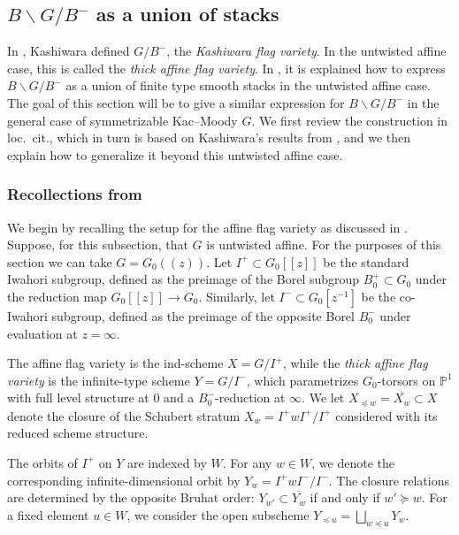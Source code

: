 \documentclass{amsart}
\theoremstyle{definition}
\numberwithin{equation}{section}
\begin{document}
\subsection{$B\backslash G / B^-$ as a union of stacks}\label{sec:unionofstacks}
In \cite{K}, Kashiwara defined $G/B^-$, the \emph{Kashiwara flag variety}. In the untwisted affine case, this is called the \emph{thick affine flag variety}. In \cite[\S 5.2]{Yun}, it is explained how to express $B\backslash G/B^-$ as a union of finite type smooth stacks in the untwisted affine case. The goal of this section will be to give a similar expression for $B\backslash G/B^-$ in the general case of symmetrizable Kac--Moody $G$. We first review the construction in loc.\ cit., which in turn is based on Kashiwara's results from \cite{K}, and we then explain how to generalize it beyond this untwisted affine case.

\subsubsection{Recollections from \cite{Yun}}\label{sec:yun-recollections}

We begin by recalling the setup for the affine flag variety as discussed in \cite[\S 5.2]{Yun}. Suppose, for this subsection, that $G$ is untwisted affine. For the purposes of this section we can take $G = G_0(\!(z)\!)$. Let $I^+ \subset G_0[[z]]$ be the standard Iwahori subgroup, defined as the preimage of the Borel subgroup $B^+_0 \subset G_0$ under the reduction map $G_0[[z]] \to G_0$. Similarly, let $I^- \subset G_0[z^{-1}]$ be the co-Iwahori subgroup, defined as the preimage of the opposite Borel $B^-_0$ under evaluation at $z = \infty$.

The affine flag variety is the ind-scheme $X = G/I^+$, while the \emph{thick affine flag variety} is the infinite-type scheme $Y = G/I^-$, which parametrizes $G_0$-torsors on $\mathbb{P}^1$ with full level structure at $0$ and a $B^-_0$-reduction at $\infty$. We let $X_{\preceq w} = \overline{X_{w}} \subset X$ denote the closure of the Schubert stratum $X_w = I^+w I^+/I^+$ considered with its reduced scheme structure.

The orbits of $I^+$ on $Y$ are indexed by $W$. For any $w \in W$, we denote the corresponding infinite-dimensional orbit by $Y_{w} = I^+ w I^- / I^-$. The closure relations are determined by the opposite Bruhat order: $Y_{w'} \subset \overline{Y_{w}}$ if and only if $w' \succeq w$. For a fixed element $u \in W$, we consider the open subscheme $Y_{\preceq u} = \bigsqcup_{w \preceq u} Y_{w}$.
\end{document}
